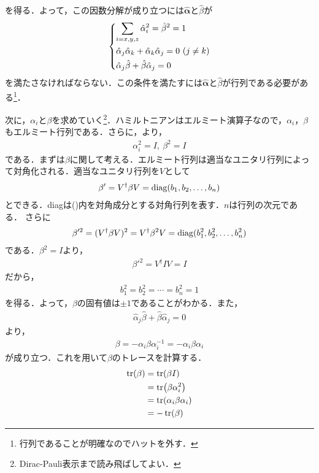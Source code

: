 \documentclass{report}
\begin{document}
を得る．よって，この因数分解が成り立つには$\bm{\hat{\alpha}}$と$\hat{\beta}$が
\begin{align}
  \label{conditons-of-coefficients-of-dirac}
  \begin{dcases}
    \sum_{i=x,y,z} \hat{\alpha}_i^2 = \hat{\beta}^2 = 1\\
    \hat{\alpha}_j \hat{\alpha}_k + \hat{\alpha}_k \hat{\alpha}_j = 0\ (j \neq k)\\
    \hat{\alpha}_j \hat{\beta} + \hat{\beta} \hat{\alpha}_j = 0
  \end{dcases}
\end{align}
を満たさなければならない．この条件を満たすには$\bm{\hat{\alpha}}$と$\hat{\beta}$が行列である必要がある\footnote{行列であることが明確なのでハットを外す．}．

次に，$\alpha_i$と$\beta$を求めていく\footnote{Dirac-Pauli表示まで読み飛ばしてよい．}．ハミルトニアンはエルミート演算子なので，$\alpha_i$，$\beta$もエルミート行列である．さらに，より，
\begin{align}
  \alpha_i^2 = I,\ \beta^2 = I
\end{align}
である．まずは$\beta$に関して考える．エルミート行列は適当なユニタリ行列によって対角化される．適当なユニタリ行列を$V$として
\begin{align}
  \beta' = V^\dagger \beta V = \mathrm{diag}(b_1, b_2, \dots, b_n)
\end{align}
とできる．diagは()内を対角成分とする対角行列を表す．$n$は行列の次元である．
さらに
\begin{align}
  \beta'^2 = (V^\dagger \beta V)^2 = V^\dagger \beta^2 V = \mathrm{diag}(b_1^2,b_2^2,\dots,b_n^2)
\end{align}
である．$\beta^2 = I$より，
\begin{align}
  \beta'^2 = V^\dagger I V = I
\end{align}
だから，
\begin{align}
  b_1^2 = b_2^2 = \cdots = b_n^2 = 1
\end{align}
を得る．よって，$\beta$の固有値は$\pm1$であることがわかる．また，
\begin{align}
  \hat{\alpha}_j \hat{\beta} + \hat{\beta} \hat{\alpha}_j = 0
\end{align}
より，
\begin{align}
  \beta = - \alpha_i\beta\alpha_i^{-1} = -\alpha_i\beta\alpha_i
\end{align}
が成り立つ．これを用いて$\beta$のトレースを計算する．
\begin{align}
  \tr(\beta) &= \tr(\beta I)\\
  &= \tr(\beta \alpha_i^2)\\
  &= \tr(\alpha_i\beta\alpha_i) \\
  &= -\tr(\beta)
\end{align}
\end{document}
